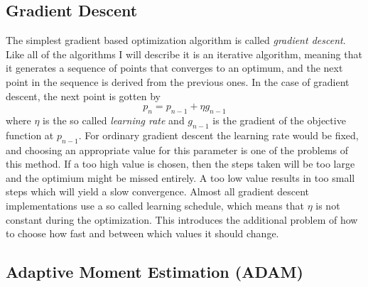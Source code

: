 
\subsection{Gradient Descent}

The simplest gradient based optimization algorithm is called \emph{gradient
descent}.
Like all of the algorithms I will describe it is an iterative algorithm,
meaning that it generates a sequence of points that converges to an optimum,
and the next point in the sequence is derived from the previous ones.
In the case of gradient descent, the next point is gotten by
\begin{equation}
	p_n = p_{n-1} + \eta g_{n-1}
\end{equation}
where $\eta$ is the so called \emph{learning rate} and $g_{n-1}$ is the gradient
of the objective function at $p_{n-1}$.
For ordinary gradient descent the learning rate would be fixed,
and choosing an appropriate value for this parameter is one of the problems of
this method.
If a too high value is chosen, then the steps taken will be too large and the
optimium might be missed entirely.
A too low value results in too small steps which will yield a slow convergence.
Almost all gradient descent implementations use a so called learning schedule,
which means that $\eta$ is not constant during the optimization.
This introduces the additional problem of how to choose how fast and between
which values it should change.

\subsection{Adaptive Moment Estimation (ADAM)}

